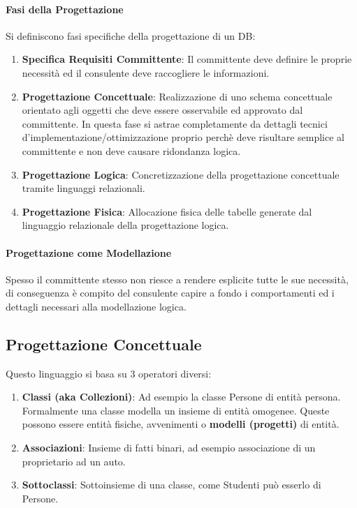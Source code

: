 \documentclass{article}
\begin{document}
\paragraph{Fasi della Progettazione} Si definiscono fasi specifiche della progettazione di un DB:

\begin{enumerate}
    \item \textbf{Specifica Requisiti Committente}: Il committente deve definire le proprie necessità ed il consulente deve
    raccogliere le informazioni.
    \item \textbf{Progettazione Concettuale}: Realizzazione di uno schema concettuale orientato agli oggetti che deve essere osservabile ed
    approvato dal committente. In questa fase si astrae completamente da dettagli tecnici d'implementazione/ottimizzazione
    proprio perchè deve risultare semplice al committente e non deve causare ridondanza logica.
    \item \textbf{Progettazione Logica}: Concretizzazione della progettazione concettuale tramite linguaggi relazionali.
    \item \textbf{Progettazione Fisica}: Allocazione fisica delle tabelle generate dal linguaggio relazionale della progettazione logica.
\end{enumerate}

\paragraph{Progettazione come Modellazione} Spesso il committente stesso non riesce a rendere esplicite tutte le sue necessità, di conseguenza
è compito del consulente capire a fondo i comportamenti ed i dettagli necessari alla modellazione logica.

\subsection{Progettazione Concettuale}

Questo linguaggio si basa su $3$ operatori diversi:

\begin{enumerate}
    \item \textbf{Classi (aka Collezioni)}: Ad esempio la classe Persone di entità persona. Formalmente una classe modella un insieme di entità omogenee. Queste possono essere
    entità fisiche, avvenimenti o \textbf{modelli (progetti)} di entità.
    \newpage
    \item \textbf{Associazioni}: Insieme di fatti binari, ad esempio associazione di un proprietario ad un auto.
    \item \textbf{Sottoclassi}: Sottoinsieme di una classe, come Studenti può esserlo di Persone.
\end{enumerate}
\end{document}
